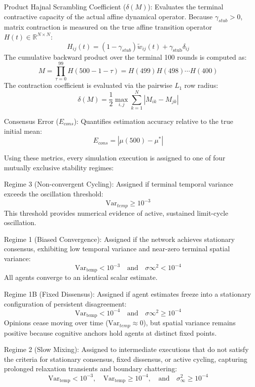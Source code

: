 Product Hajnal Scrambling Coefficient ($\delta(M)$): Evaluates the terminal contractive capacity of the actual affine dynamical operator\cite{degroot1974reaching,acemoglu2013opinion}. Because $\gamma_{stub} > 0$, matrix contraction is measured on the true affine transition operator $H(t) \in \mathbb{R}^{N \times N}$\cite{acemoglu2013opinion}: $$H_{ij}(t) = (1 - \gamma_{stub}) \tilde{w}_{ij}(t) + \gamma_{\text{stub}} \delta_{ij}$$ The cumulative backward product over the terminal 100 rounds is computed as\cite{acemoglu2013opinion}: $$M = \prod_{\tau=0}^{99} H(500 - 1 - \tau) = H(499) H(498) \cdots H(400)$$ The contraction coefficient is evaluated via the pairwise $L_1$ row radius\cite{degroot1974reaching}: $$\delta(M) = \frac{1}{2} \max_{i, j} \sum_{k=1}^N |M_{ik} - M_{jk}|$$

Consensus Error ($E_{cons}$): Quantifies estimation accuracy relative to the true initial mean\cite{degroot1974reaching}: $$E_{cons} = |\mu(500) - \mu^*|$$

Using these metrics, every simulation execution is assigned to one of four mutually exclusive stability regimes\cite{acemoglu2013opinion}:

Regime 3 (Non-convergent Cycling): Assigned if terminal temporal variance exceeds the oscillation threshold\cite{degroot1974reaching,acemoglu2013opinion}: $$\text{Var}_{temp} \ge 10^{-3}$$ This threshold provides numerical evidence of active, sustained limit-cycle oscillation\cite{degroot1974reaching}.

Regime 1 (Biased Convergence): Assigned if the network achieves stationary consensus, exhibiting low temporal variance and near-zero terminal spatial variance\cite{degroot1974reaching,acemoglu2013opinion}: $$\text{Var}_{\text{temp}} < 10^{-3} \quad \text{and} \quad \sigma{\infty}^2 < 10^{-4}$$ All agents converge to an identical scalar estimate\cite{acemoglu2013opinion}.

Regime 1B (Fixed Dissensus): Assigned if agent estimates freeze into a stationary configuration of persistent disagreement\cite{acemoglu2013opinion}: $$\text{Var}_{\text{temp}} < 10^{-4} \quad \text{and} \quad \sigma{\infty}^2 \ge 10^{-4}$$ Opinions cease moving over time ($\text{Var}_{temp} \approx 0$), but spatial variance remains positive because cognitive anchors hold agents at distinct fixed points\cite{acemoglu2013opinion}.

Regime 2 (Slow Mixing): Assigned to intermediate executions that do not satisfy the criteria for stationary consensus, fixed dissensus, or active cycling, capturing prolonged relaxation transients and boundary chattering\cite{degroot1974reaching,acemoglu2013opinion}: $$\text{Var}_{\text{temp}} < 10^{-3}, \quad \text{Var}_{\text{temp}} \ge 10^{-4}, \quad \text{and} \quad \sigma_{\infty}^2 \ge 10^{-4}$$



